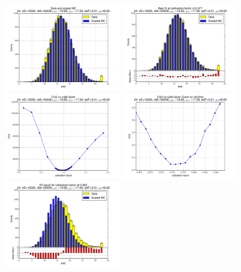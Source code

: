 
 \begin{figure}[htbp] \begin{center} 
\includegraphics[width=0.45\textwidth]{../FIGURES/24/FIG_Data_and_scaled_MC.pdf} 
\includegraphics[width=0.45\textwidth]{../FIGURES/24/FIG_Best_fit_at_calibration_factor_of_0_977.pdf} 
\includegraphics[width=0.45\textwidth]{../FIGURES/24/FIG_Chi2_vs_calib_factor.pdf} 
\includegraphics[width=0.45\textwidth]{../FIGURES/24/FIG_Chi2_vs_calib_factor_Zoom_on_chi2min.pdf} 
\includegraphics[width=0.45\textwidth]{../FIGURES/24/FIG_Fit_result_for_calibration_factor_of_0_892.pdf} 

\end{center}
\end{figure}
